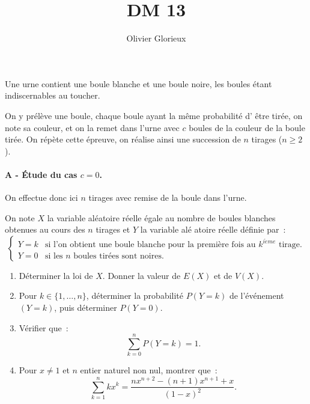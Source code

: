 \documentclass[a4paper, 11pt,reqno]{article}
\author{Olivier Glorieux}
\begin{document}
\title{DM 13 }


\begin{exercice}




Une urne contient une boule blanche et une boule noire, les boules \'etant
indiscernables au toucher.

On y pr\'el\`eve une boule, chaque boule ayant la m\^{e}me probabilit\'e d'%
\^{e}tre tir\'ee, on note sa couleur, et on la remet dans l'urne avec $c$
boules de la couleur de la boule tir\'ee. On r\'ep\`ete cette \'epreuve, on
r\'ealise ainsi une succession de $n$ tirages ($n\geqslant 2$).

\paragraph{\small{A - \'Etude du cas $c=0$.}\\}

On effectue donc ici $n$ tirages avec remise de la boule dans l'urne.

On note $X$ la variable al\'{e}atoire r\'{e}elle \'{e}gale au nombre de
boules blanches obtenues au cours des $n$ tirages et $Y$ la variable al\'{e}%
atoire r\'{e}elle d\'{e}finie par~: 
\begin{equation*}
\begin{cases}
Y=k & \text{si l'on obtient une boule blanche pour la premi\`{e}re fois au }%
k^{i\grave{e}me}\text{ tirage.} \\ 
Y=0 & \text{si les $n$ boules tir\'{e}es sont noires.}%
\end{cases}%
\end{equation*}

\begin{enumerate}
\item D\'{e}terminer la loi de $X$. Donner la valeur de $E(X)$ et de $V(X)$.

\item Pour $k\in \{1,\ldots ,n\}$, d\'{e}terminer la probabilit\'{e} $P(Y=k) 
$ de l'\'{e}v\'{e}nement $(Y=k)$, puis d\'{e}terminer $P(Y=0)$.

\item V\'{e}rifier que~: 
\begin{equation*}
\sum_{k=0}^{n}P(Y=k)=1.
\end{equation*}

\item Pour $x\neq 1$ et $n$ entier naturel non nul, montrer que~: 
\begin{equation*}
\sum_{k=1}^{n}kx^{k}=\frac{nx^{n+2}-(n+1)x^{n+1}+x}{(1-x)^{2}}.
\end{equation*}


\end{enumerate}
\end{exercice}
\end{document}
